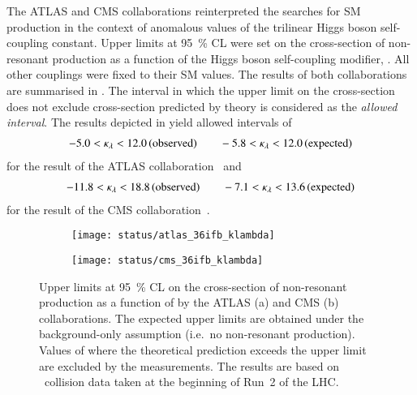 The ATLAS and CMS collaborations reinterpreted the searches for SM \HH
production in the context of anomalous values of the trilinear Higgs boson
self-coupling constant. Upper limits at \SI{95}{\percent} CL were set on the
cross-section of non-resonant \HH production as a function of the Higgs boson
self-coupling modifier, \klambda. All other couplings were fixed to their SM
values. The results of both collaborations are summarised in
. The \klambda interval in which the upper limit
on the cross-section does not exclude cross-section predicted by theory is
considered as the \emph{allowed \klambda interval}. The results depicted in
 yield allowed \klambda intervals of
\begin{align*}
  -5.0 < \kappa_{\lambda} < 12.0 \,\text{(observed)} \qquad -5.8 < \kappa_{\lambda} < 12.0 \,\text{(expected)}
\end{align*}
for the result of the ATLAS collaboration~\cite{HDBS-2018-58} and
\begin{align*}
  -11.8 < \kappa_{\lambda} < 18.8 \,\text{(observed)} \qquad -7.1 < \kappa_{\lambda} < 13.6 \,\text{(expected)}
\end{align*}
for the result of the CMS collaboration~\cite{CMS-HIG-17-030}.

\begin{figure}[htbp]
  \centering

  \begin{subfigure}[b]{0.9\textwidth}
    \centering

    \texttt{[image: status/atlas\_36ifb\_klambda]}


  \end{subfigure}

  \vspace{0.5em}

  \begin{subfigure}[b]{0.9\textwidth}
    \centering

    \texttt{[image: status/cms\_36ifb\_klambda]}

  \end{subfigure}

  \caption{Upper limits at \SI{95}{\percent} CL on the cross-section of
    non-resonant \HH production as a function of \klambda by the ATLAS (a) and
    CMS (b) collaborations. The expected upper limits are obtained under the
    background-only assumption (i.e.\ no non-resonant \HH production). Values of
    \klambda where the theoretical prediction exceeds the upper limit are
    excluded by the measurements. The results are based on \pp~collision data
    taken at the beginning of Run~2 of the LHC.}%
  \label{fig:prior_status_klambda}
\end{figure}


